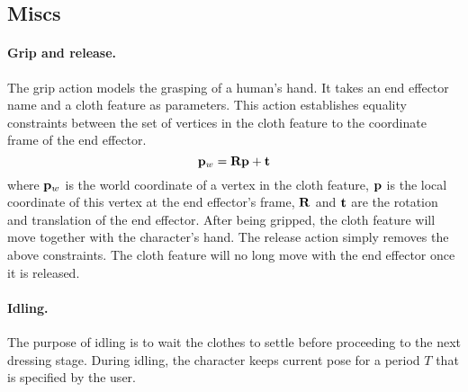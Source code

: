 \subsection{Miscs}

\paragraph{Grip and release.}
The grip action models the grasping of a human's hand. It takes an end effector name and a cloth feature as parameters. This action establishes equality constraints between the set of vertices in the cloth feature to the coordinate frame of the end effector.
\begin{displaymath}
\mathbf{p}_w = \mathbf{Rp} + \mathbf{t}
\end{displaymath}
where $\mathbf{p}_w$ is the world coordinate of a vertex in the cloth feature, $\mathbf{p}$ is the local coordinate of this vertex at the end effector's frame, $\mathbf{R}$ and $\mathbf{t}$ are the rotation and translation of the end effector. After being gripped, the cloth feature will move together with the character's hand. The release action simply removes the above constraints. The cloth feature will no long move with the end effector once it is released.

\paragraph{Idling.} The purpose of idling is to wait the clothes to settle before proceeding to the next dressing stage. During idling, the character keeps current pose for a period $T$ that is specified by the user.

